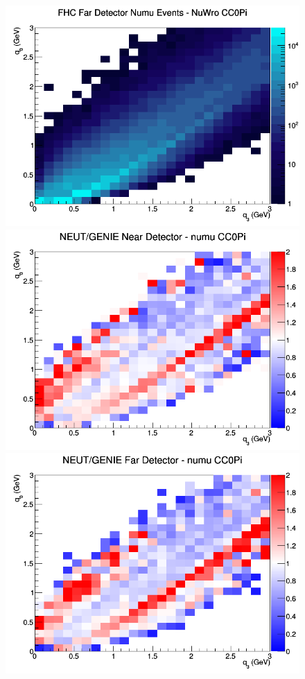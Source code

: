 \documentclass[12pt]{article}
\begin{document}
\begin{figure}[h]
\endminipage
{}
\includegraphics[width=\linewidth]{eff_q0_q3/FGT/CC0Pi_FHC_FD_numu_q3_q0_NuWro.png}
\endminipage
\newline
{}
\includegraphics[width=\linewidth]{eff_q0_q3/FGT/ratios/CC0Pi_NEUT_GENIE_numu_near_q3_q0.png}
\endminipage
{}
\includegraphics[width=\linewidth]{eff_q0_q3/FGT/ratios/CC0Pi_NEUT_GENIE_numu_far_q3_q0.png}

\end{figure}
\end{document}
